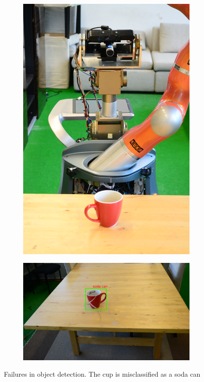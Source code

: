 \begin{figure}[htp]
\centering
\begin{subfigure}{.4\textwidth}
  \centering
  \includegraphics[width=0.9\linewidth, angle=-90]{images/robot_looking_cup.jpg}
\end{subfigure}%
\begin{subfigure}{.6\textwidth}
  \centering
  \includegraphics[width=\linewidth]{images/robot_view_cup.jpg}
\end{subfigure}
\caption[Fault tolerant search example]{Failures in object detection. The cup is misclassified as a soda can}
\end{figure}

